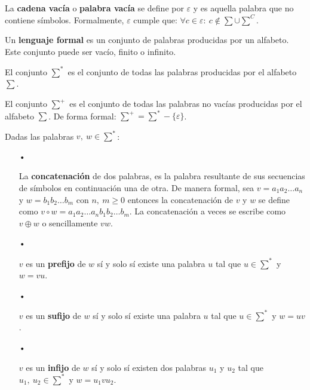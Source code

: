 \begin{definition}
	La \textbf{cadena vacía} o \textbf{palabra vacía} se define por $\varepsilon$ y es aquella palabra que no contiene símbolos. Formalmente, $\varepsilon$ cumple que: $\forall c\in\varepsilon:~c\notin\sum\cup\sum^C$.
\end{definition}

\begin{definition}
	Un \textbf{lenguaje formal} es un conjunto de palabras producidas por un alfabeto. Este conjunto puede ser vacío, finito o infinito.
\end{definition}

\begin{definition}
	El conjunto $\sum^*$ es el conjunto de todas las palabras producidas por el alfabeto $\sum$.
\end{definition}

\begin{definition}
	El conjunto $\sum^+$ es el conjunto de todas las palabras no vacías producidas por el alfabeto $\sum$. De forma formal: $\sum^+=\sum^*-\{\varepsilon\}$.
\end{definition}

\noindent Dadas las palabras $v,~w\in\sum^*$:

\begin{itemize}
	\item[•] \begin{definition}
		La \textbf{concatenación} de dos palabras, es la palabra resultante de sus secuencias de símbolos en continuación una de otra. De manera formal, sea $v=a_1a_2\dots a_n$ y $w=b_1b_2\dots b_m$ con $n,~m\ge0$ entonces la concatenación de $v$ y $w$ se define como $v\circ w=a_1a_2\dots a_nb_1b_2\dots b_m$. La concatenación a veces se escribe como $v\oplus w$ o sencillamente $vw$.
	\end{definition}

	\item[•] \begin{definition}
		$v$ es un \textbf{prefijo} de $w$ sí y solo sí existe una palabra $u$ tal que $u\in\sum^*$ y $w=vu$.
	\end{definition}

	\item[•] \begin{definition}
		$v$ es un \textbf{sufijo} de $w$ sí y solo sí existe una palabra $u$ tal que $u\in\sum^*$ y $w=uv$.
	\end{definition}

	\item[•] \begin{definition}
		$v$ es un \textbf{infijo} de $w$ sí y solo sí existen dos palabras $u_1$ y $u_2$ tal que $u_1,~u_2\in\sum^*$ y $w=u_1vu_2$.
	\end{definition}
\end{itemize}

